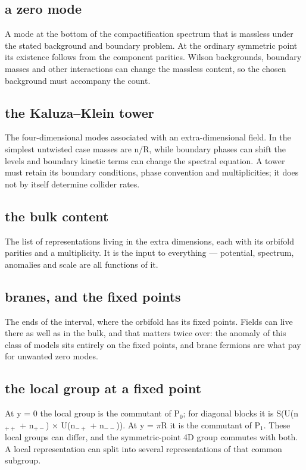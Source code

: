 \documentclass[11pt,a4paper]{article}
\begin{document}
\subsection*{a zero mode}
A mode at the bottom of the compactification spectrum that is massless under the stated background and boundary problem. At the ordinary symmetric point its existence follows from the component parities. Wilson backgrounds, boundary masses and other interactions can change the massless content, so the chosen background must accompany the count.

\subsection*{the Kaluza--Klein tower}
The four-dimensional modes associated with an extra-dimensional field. In the simplest untwisted case masses are n/R, while boundary phases can shift the levels and boundary kinetic terms can change the spectral equation. A tower must retain its boundary conditions, phase convention and multiplicities; it does not by itself determine collider rates.

\subsection*{the bulk content}
The list of representations living in the extra dimensions, each with its orbifold parities and a multiplicity. It is the input to everything --- potential, spectrum, anomalies and scale are all functions of it.

\subsection*{branes, and the fixed points}
The ends of the interval, where the orbifold has its fixed points. Fields can live there as well as in the bulk, and that matters twice over: the anomaly of this class of models sits entirely on the fixed points, and brane fermions are what pay for unwanted zero modes.

\subsection*{the local group at a fixed point}
At y = 0 the local group is the commutant of P\ensuremath{{}_{0}}; for diagonal blocks it is S(U(n\ensuremath{{}_{++}} + n\ensuremath{{}_{+-}}) \ensuremath{\times} U(n\ensuremath{{}_{-+}} + n\ensuremath{{}_{--}})). At y = \ensuremath{\pi}R it is the commutant of P\ensuremath{{}_{1}}. These local groups can differ, and the symmetric-point 4D group commutes with both. A local representation can split into several representations of that common subgroup.
\end{document}
